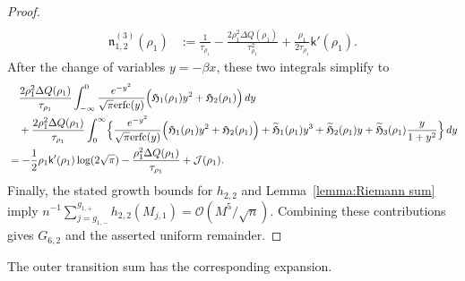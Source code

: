 \documentclass[a4paper]{article}
\numberwithin{equation}{section}
\begin{document}
\begin{proof}
\begin{align*}
\\
\mathfrak{n}_{1,2}^{(3)}(\rho_1)&:= 
\frac{1}{\tau_{\rho_1}}-\frac{2\rho_1^2\Delta Q(\rho_1)}{\tau_{\rho_1}^2}+\frac{\rho_1}{2\tau_{\rho_1}}\mathsf{k}'(\rho_1).
 \end{align*}
After the change of variables $y=-\beta x$, these two integrals simplify to
\begin{align*}
&\quad
\frac{2\rho_1^2\Delta Q(\rho_1)}{\tau_{\rho_1}}\int_{-\infty}^{0}\frac{e^{-y^2}}{\sqrt{\pi}\mathrm{erfc}(y)}
\Bigl( 
\mathfrak{H}_1(\rho_1)y^2+\mathfrak{H}_2(\rho_1)
\Bigr)\,dy
\\
&\quad 
+\frac{2\rho_1^2\Delta Q(\rho_1)}{\tau_{\rho_1}}
\int_0^{\infty}
\Bigl\{
\frac{e^{-y^2}}{\sqrt{\pi}\mathrm{erfc}(y)}\Bigl(\mathfrak{H}_1(\rho_1)y^2+\mathfrak{H}_2(\rho_1)\Bigr)
+\widetilde{\mathfrak{H}}_1(\rho_1)y^3+\widetilde{\mathfrak{H}}_2(\rho_1)y+\widetilde{\mathfrak{H}}_3(\rho_1)\frac{y}{1+y^2}
\Bigr\}\,dy
\\
&=
-\frac{1}{2}\rho_1\mathsf{k}'(\rho_1)\log(2\sqrt{\pi})
-\frac{\rho_1^2\Delta Q(\rho_1)}{\tau_{\rho_1}}
+\mathcal{J}(\rho_1). 
\end{align*}
Finally, the stated growth bounds for $h_{2,2}$ and Lemma~\ref{lemma:Riemann sum} imply
$n^{-1}\sum_{j=g_{1,-}}^{g_{1,+}}h_{2,2}(M_{j,1})=\mathcal O(M^5/\sqrt n)$. Combining these contributions gives $G_{6,2}$ and the asserted uniform remainder.
\end{proof}
The outer transition sum has the corresponding expansion.
\end{document}

